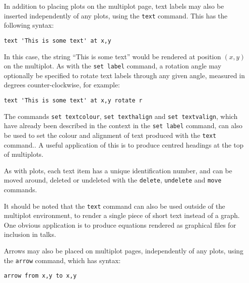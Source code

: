 \documentclass[a4paper,onecolumn,11pt]{book}
\begin{document}
\label{text_command} In addition to
placing plots on the multiplot page, text labels may also be inserted
independently of any plots, using the \texttt{text} command. This has the
following syntax:

\begin{verbatim} 
text 'This is some text' at x,y
\end{verbatim}

In this case, the string ``This is some text'' would be rendered at position
$(x,y)$ on the multiplot. As with the \texttt{set label} command, a rotation
angle may optionally be specified to rotate text labels through any given
angle, measured in degrees counter-clockwise, for example:

\begin{verbatim} 
text 'This is some text' at x,y rotate r
\end{verbatim}

The commands \texttt{set textcolour}, \texttt{set
texthalign} and \texttt{set textvalign}, which have already been described in
the context in the \texttt{set label} command, can also be used to set the
colour and alignment of text produced with the \texttt{text} command.. A useful application of this is to
produce centred headings at the top of multiplots.

As with plots, each text item has a unique identification number, and can be
moved around, deleted or undeleted with the \texttt{delete}, \texttt{undelete}
and \texttt{move} commands.

It should be noted that the \texttt{text} command can also be used outside of
the multiplot environment, to render a single piece of short text instead of a
graph. One obvious application is to produce equations rendered as graphical
files for inclusion in talks.

\label{arrows}  Arrows may also be
placed on multiplot pages, independently of any plots, using the \texttt{arrow}
command, which has syntax:

\begin{verbatim} 
arrow from x,y to x,y
\end{verbatim}
\end{document}
